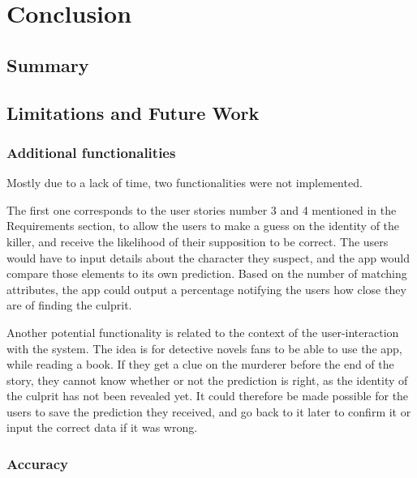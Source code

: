 \documentclass{mproj}
\begin{document}
\chapter{Conclusion}\label{conclusion}

\section{Summary}

\section{Limitations and Future Work}

\subsection{Additional functionalities}

\hspace{5mm} Mostly due to a lack of time, two functionalities were not implemented.\par

The first one corresponds to the user stories number 3 and 4 mentioned in the Requirements section, to allow the users to make a guess on the identity of the killer, and receive the likelihood of their supposition to be correct. The users would have to input details about the character they suspect, and the app would compare those elements to its own prediction. Based on the number of matching attributes, the app could output a percentage notifying the users how close they are of finding the culprit. \par

Another potential functionality is related to the context of the user-interaction with the system. The idea is for detective novels fans to be able to use the app, while reading a book. If they get a clue on the murderer before the end of the story, they cannot know whether or not the prediction is right, as the identity of the culprit has not been revealed yet. It could therefore be made possible for the users to save the prediction they received, and go back to it later to confirm it or input the correct data if it was wrong.

\subsection{Accuracy}
\end{document}
